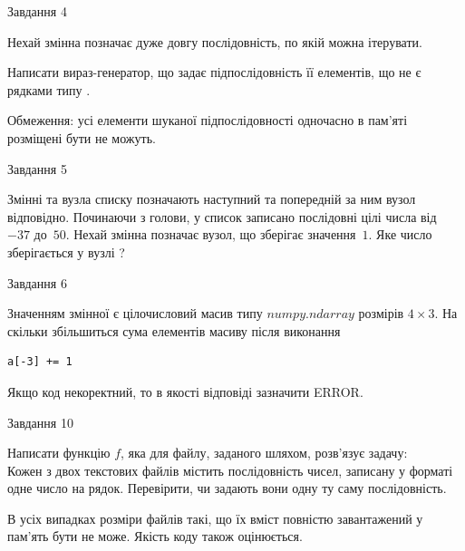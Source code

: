 \documentclass[12pt, ukrainian]{article}
\begin{document}
{               
{\begin{center}Завдання {4}\end{center}}
\vspace{-6mm}
Нехай змінна  позначає дуже довгу послідовність, по якій можна ітерувати.

Написати вираз-генератор, що задає підпослідовність її елементів, що не є рядками типу .

Обмеження: усі елементи шуканої підпослідовності одночасно в пам'яті розміщені бути не можуть.\par

\vspace{10mm}
               
{\begin{center}Завдання {5}\end{center}}
\vspace{-6mm}
Змінні  та  вузла списку позначають наступний та попередній за ним вузол відповідно. Починаючи з голови, у список записано послідовні цілі числа від~$-37$ до~$50$. Нехай змінна  позначає вузол, що зберігає значення~$1$.
Яке число зберігається у вузлі  ?\par

               
{\begin{center}Завдання {6}\end{center}}
\vspace{-6mm}
Значенням змінної  є цілочисловий масив типу $numpy.ndarray$ розмірів $4{\times}3$. На скільки збільшиться сума елементів масиву  після виконання
\begin{verbatim}
a[-3] += 1
\end{verbatim}


Якщо код некоректний, то в якості відповіді зазначити ERROR.\par

               
{\begin{center}Завдання {10}\end{center}}
\vspace{-6mm}

Написати функцію $f$, яка для файлу, заданого шляхом, розв’язує задачу:\\ Кожен з двох текстових файлів містить послідовність чисел, записану у форматі одне число на рядок.  Перевірити, чи задають вони одну ту саму послідовність.

В усіх випадках розміри файлів такі, що їх вміст повністю завантажений у пам'ять бути не може. Якість коду також оцінюється.



}
\end{document}

